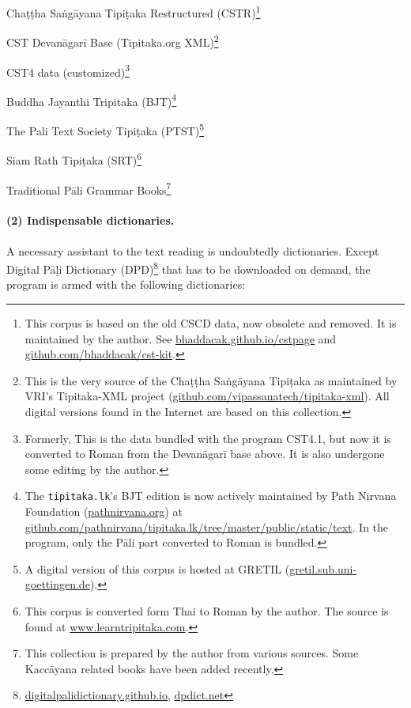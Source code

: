 \begin{compactitem}
\item Chaṭṭha Saṅgāyana Tipiṭaka Restructured (CSTR)\footnote{This corpus is based on the old CSCD data, now obsolete and removed. It is maintained by the author. See \url{bhaddacak.github.io/cstpage} and \url{github.com/bhaddacak/cst-kit}.}
\item CST Devanāgarī Base (Tipitaka.org XML)\footnote{This is the very source of the Chaṭṭha Saṅgāyana Tipiṭaka as maintained by VRI's Tipitaka-XML project (\url{github.com/vipassanatech/tipitaka-xml}). All digital versions found in the Internet are based on this collection.}
\item CST4 data (customized)\footnote{Formerly, This is the data bundled with the program CST4.1, but now it is converted to Roman from the Devanāgarī base above. It is also undergone some editing by the author.}
\item Buddha Jayanthi Tripitaka (BJT)\footnote{The \texttt{tipitaka.lk}'s BJT edition is now actively maintained by Path Nirvana Foundation (\url{pathnirvana.org}) at \url{github.com/pathnirvana/tipitaka.lk/tree/master/public/static/text}. In the program, only the Pāli part converted to Roman is bundled.}
\item The Pali Text Society Tipiṭaka (PTST)\footnote{A digital version of this corpus is hosted at GRETIL (\url{gretil.sub.uni-goettingen.de}).}
\item Siam Rath Tipiṭaka (SRT)\footnote{This corpus is converted form Thai to Roman by the author. The source is found at \url{www.learntripitaka.com}.}
\item Traditional Pāli Grammar Books\footnote{This collection is prepared by the author from various sources. Some Kaccāyana related books have been added recently.}
\end{compactitem}

\paragraph{(2) Indispensable dictionaries.} A necessary assistant to the text reading is undoubtedly dictionaries. Except Digital Pāḷi Dictionary (DPD)\footnote{\url{digitalpalidictionary.github.io}, \url{dpdict.net}} that has to be downloaded on demand, the program is armed with the following dictionaries:

